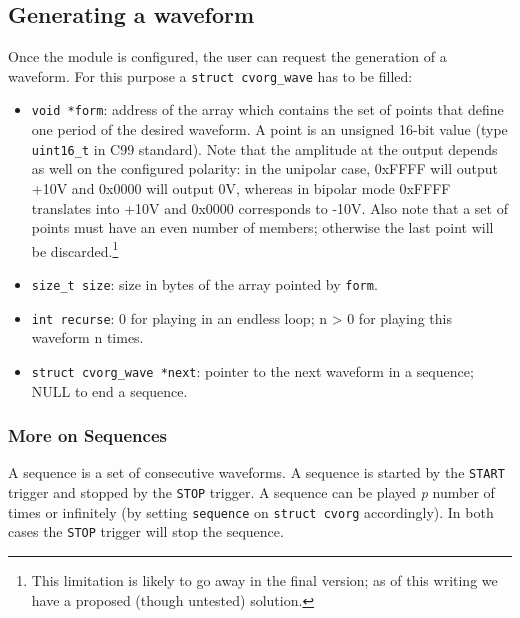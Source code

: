 \documentclass[12pt,a4paper]{article}
\begin{document}
\subsection*{Generating a waveform}
\label{sec-2.4}

   Once the module is configured, the user can request the generation of a
   waveform. For this purpose a \verb~struct cvorg_wave~ has to be filled:
\begin{itemize}
\item \verb~void *form~: address of the array which contains the set of points that
     define one period of the desired waveform. A point is an unsigned 16-bit
     value (type \verb~uint16_t~ in C99 standard). Note that the amplitude at the
     output depends as well on the configured polarity: in the unipolar case,
     0xFFFF will output +10V and 0x0000 will output 0V, whereas in bipolar
     mode 0xFFFF translates into +10V and 0x0000 corresponds to -10V.
     Also note that a set of points must have an even number of members;
     otherwise the last point will be discarded.\footnote{This limitation is likely
     to go away in the final version; as of this writing we have a proposed
     (though untested) solution. }
\item \verb~size_t size~: size in bytes of the array pointed by \verb~form~.
\item \verb~int recurse~: 0 for playing in an endless loop; n > 0 for playing
     this waveform n times.
\item \verb~struct cvorg_wave *next~: pointer to the next waveform in a sequence;
     NULL to end a sequence.
\end{itemize}
\subsubsection*{More on Sequences}
\label{sec-2.4.1}

    A sequence is a set of consecutive waveforms. A sequence is started by
    the \verb~START~ trigger and stopped by the \verb~STOP~ trigger. A sequence can
    be played \emph{p} number of times or infinitely (by setting \verb~sequence~ on
    \verb~struct cvorg~ accordingly). In both cases the \verb~STOP~ trigger will stop
    the sequence.
\end{document}
